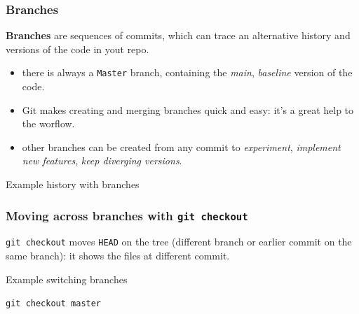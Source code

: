 \documentclass[10pt,svgnames,handout]{beamer}
\begin{document}
\begin{frame}
\frametitle{Branches}

\textbf{Branches} are sequences of commits, which can trace an alternative history and versions of the code in yout repo.\\
\begin{itemize}
  \item there is always a \lstinline{Master} branch, containing the \emph{main}, \emph{baseline} version of the code.
  \item Git makes creating and merging branches quick and easy: it's a great help to the worflow.
  \item other branches can be created from any commit to \emph{experiment}, \emph{implement new features}, \emph{keep diverging versions}.
\end{itemize}
\pause

\begin{block}{Example history with branches}

\end{block}

\end{frame}


\begin{frame}
\frametitle{Moving across branches with \lstinline{git checkout}}

\lstinline{git checkout} moves \lstinline{HEAD} on the tree (different branch or earlier commit on the same branch): it shows the files at  different commit.\\
\medskip
\pause

\begin{block}{Example switching branches}

\pause
\lstinline{git checkout master}
\pause


\end{block}
\end{frame}
\end{document}
